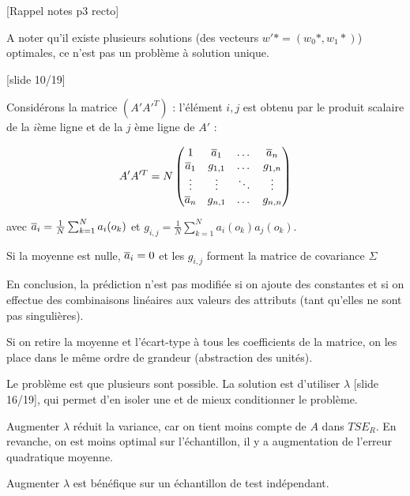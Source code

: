 		[Rappel notes p3 recto]
		
		A noter qu'il existe plusieurs solutions (des vecteurs $w'* = (w_0*, w_1*)$) optimales, ce n'est pas un problème à solution unique.
		
		[slide 10/19]
		
		Considérons la matrice $(A'A'^T)$ : l'élément $i, j$ est obtenu par le produit scalaire de la $i$ème ligne et de la $j$ ème ligne de $A'$ :
		
		$$A'A'^T = N \begin{pmatrix}
		1 &  \overline{a}_1 & \dots & \overline{a}_n \\ 
		\overline{a}_1 & g_{1,1} & \dots & g_{1, n} \\
		\vdots & \vdots & \ddots & \vdots \\
		\overline{a}_n & g_{n, 1} & \dots & g_{n, n}
		\end{pmatrix} $$
		
		avec $\overline{a}_i = \frac{1}{N} \sum_{k = 1}^N a_i(o_k)$ et $g_{i, j} = \frac{1}{N} \sum_{k = 1}^N a_i(o_k)a_j(o_k)$.
		
		Si la moyenne est nulle, $\overline{a}_i = 0$ et les $g_{i, j}$ forment la matrice de covariance $\Sigma$
		
		
		En conclusion, la prédiction n'est pas modifiée si on ajoute des constantes et si on effectue des combinaisons linéaires aux valeurs des attributs (tant qu'elles ne sont pas singulières).
		
		Si on retire la moyenne et l'écart-type à tous les coefficients de la matrice, on les place dans le même ordre de grandeur (abstraction des unités).
		
		
		Le problème est que plusieurs sont possible. La solution est d'utiliser $\lambda$ [slide 16/19], qui permet d'en isoler une et de mieux conditionner le problème.
		
		Augmenter $\lambda$ réduit la variance, car on tient moins compte de $A$ dans $TSE_R$. En revanche, on est moins optimal sur l'échantillon, il y a augmentation de l'erreur quadratique moyenne.
		
		
		Augmenter $\lambda$ est bénéfique sur un échantillon de test indépendant.
		
		
		
		
		
		
